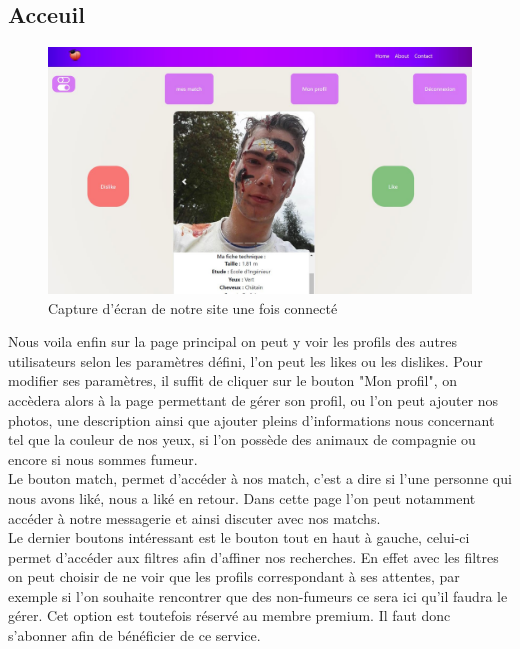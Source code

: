 \documentclass[12pt]{report}
\begin{document}
\subsection{Acceuil}
\begin{figure}[h!]
	\begin{center}
		\includegraphics[scale=0.5]{principal.jpg}
	\end{center}
		\caption{Capture d'écran de notre site une fois connecté}
\end{figure}
Nous voila enfin sur la page principal on peut y voir les profils des autres utilisateurs selon les paramètres défini, l'on peut les likes ou les dislikes. Pour modifier ses paramètres, il suffit de cliquer sur le bouton "Mon profil", on accèdera alors à la page permettant de gérer son profil, ou l'on peut ajouter nos photos, une description ainsi que ajouter pleins d'informations nous concernant tel que la couleur de nos yeux, si l'on possède des animaux de compagnie ou encore si nous sommes fumeur.\\
Le bouton match, permet d'accéder à nos match, c'est a dire si l'une personne qui nous avons liké, nous a liké en retour. Dans cette page l'on peut notamment accéder à notre messagerie et ainsi discuter avec nos matchs.
\\
Le dernier boutons intéressant est le bouton tout en haut à gauche, celui-ci permet d'accéder aux filtres afin d'affiner nos recherches. En effet avec les filtres on peut choisir de ne voir que les profils correspondant à ses attentes, par exemple si l'on souhaite rencontrer que des non-fumeurs ce sera ici qu'il faudra le gérer. Cet option est toutefois réservé au membre premium. Il faut donc s'abonner afin de bénéficier de ce service.
\clearpage
\end{document}

